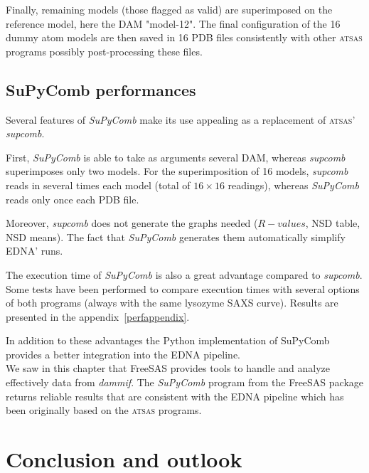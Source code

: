 \documentclass[a4paper, 11pt]{report}
\begin{document}
Finally, remaining models (those flagged as valid) are superimposed 
on the reference model, here the DAM "model-12". 
The final configuration of the 16 dummy atom models are then saved in 
16 PDB files consistently with other \textsc{atsas} programs possibly 
post-processing these files.

\section{SuPyComb performances}

Several features of \textit{SuPyComb} make its use appealing as a 
replacement of \textsc{atsas}' \textit{supcomb}.

First, \textit{SuPyComb} is able to take as arguments several DAM, 
whereas \textit{supcomb} superimposes only two models. 
For the superimposition of 16 models, \textit{supcomb} reads in 
several times each model (total of $16 \times 16$ readings), whereas 
\textit{SuPyComb} reads only once each PDB file.

Moreover, \textit{supcomb} does not generate the graphs needed 
($R-values$, NSD table, NSD means). 
The fact that \textit{SuPyComb} generates them automatically simplify 
EDNA' runs.

The execution time of \textit{SuPyComb} is also a great advantage 
compared to \textit{supcomb}. 
Some tests have been performed to compare execution times with several 
options of both programs (always with the same lysozyme SAXS curve). 
Results are presented in the appendix~\ref{perfappendix}.

In addition to these advantages the Python implementation of SuPyComb 
provides a better integration into the EDNA pipeline.\\

We saw in this chapter that FreeSAS provides tools to handle and 
analyze effectively data from \textit{dammif}. 
The \textit{SuPyComb} program from the FreeSAS package returns 
reliable results that are consistent with the EDNA pipeline which has 
been originally based on the \textsc{atsas} programs.


\chapter*{Conclusion and outlook}
\end{document}
